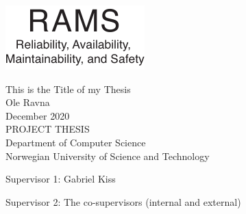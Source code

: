 
\thispagestyle{empty}
\includegraphics[scale=1.1]{fig/rams}
\mbox{}\\[6pc]
\begin{center}
\Huge{This is the Title of my Thesis}\\[2pc]

\Large{Ole Ravna}\\[1pc]
\large{December 2020}\\[2pc]

PROJECT THESIS\\
Department of Computer Science\\
Norwegian University of Science and Technology
\end{center}
\vfill

\noindent Supervisor 1: Gabriel Kiss 

\noindent Supervisor 2: The co-supervisors (internal and external)


